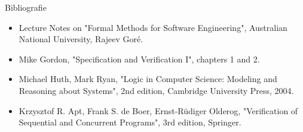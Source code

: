 %
%
%
%
%
%

\begin{frame}{Bibliografie}

{\footnotesize
\begin{itemize}
	\item Lecture Notes on "Formal Methods for Software Engineering", Australian National University, Rajeev Gor\'{e}.
	\item Mike Gordon, "Specification and Verification I", chapters 1 and 2. 
	\item Michael Huth, Mark Ryan, "Logic in Computer Science: Modeling and Reasoning about Systems", 2nd edition, Cambridge University Press, 2004.
	\item Krzysztof R. Apt, Frank S. de Boer, Ernst-R\"{u}diger Olderog, "Verification of Sequential and Concurrent Programs", 3rd edition,  Springer.
\end{itemize}
}
\end{frame}
